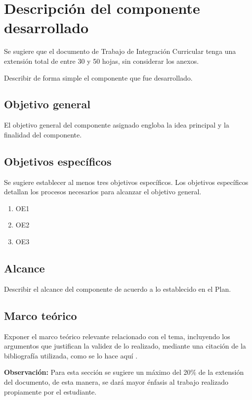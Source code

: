 \chapter{Descripción del componente desarrollado}

Se sugiere que el documento de Trabajo de Integración Curricular tenga una extensión total de entre 30 y 50 hojas, sin considerar los anexos.

Describir de forma simple el componente que fue desarrollado.

\section{Objetivo general}

El objetivo general del componente asignado engloba la idea principal y la finalidad del componente.

\section{Objetivos específicos}

Se sugiere establecer al menos tres objetivos específicos. Los objetivos específicos detallan los procesos necesarios para alcanzar el objetivo general.

\begin{enumerate}
    \item OE1
    \item OE2
    \item OE3
\end{enumerate}

\section{Alcance}

Describir el alcance del componente de acuerdo a lo establecido en el Plan.

\section{Marco teórico}

Exponer el marco teórico relevante relacionado con el tema, incluyendo los argumentos que justifican la validez de lo realizado, mediante una citación de la bibliografía utilizada, como se lo hace aquí \cite{brezis2011functional}.

\textbf{Observación:} Para esta sección se sugiere un máximo del 20\% de la extensión del documento, de esta manera, se dará mayor énfasis al trabajo realizado propiamente por el estudiante.
